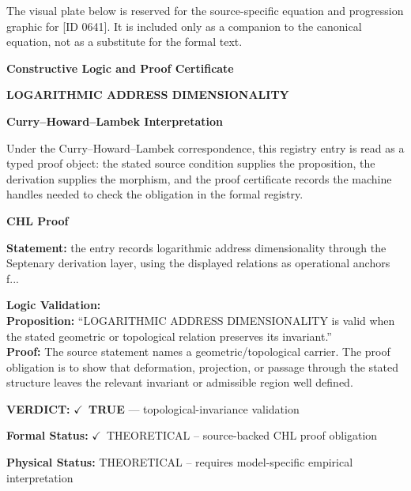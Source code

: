 \begingroup\footnotesize\sloppy
The visual plate below is reserved for the source-specific equation and progression graphic for [ID 0641]. It is included only as a companion to the canonical equation, not as a substitute for the formal text.
\par\endgroup
\ifTZPDarkEdition
{}
\fi

\clearpage
\begingroup\tzpsupportsetup
\noindent\textbf{\fontsize{10.8pt}{12.8pt}\selectfont [ID 0641] Constructive Logic and Proof Certificate}\par
\noindent\textbf{\fontsize{10pt}{12pt}\selectfont LOGARITHMIC ADDRESS DIMENSIONALITY}\par
\vspace{0.45em}
\begingroup
\footnotesize
\setlength{\parskip}{0.22em}
\setlength{\parindent}{0pt}
\noindent\textbf{Curry--Howard--Lambek Interpretation}\par
Under the Curry--Howard--Lambek correspondence, this registry entry is read as a typed proof
object: the stated source condition supplies the proposition, the derivation supplies the
morphism, and the proof certificate records the machine handles needed to check the obligation
in the formal registry.

\vspace{0.45em}
\noindent\textbf{CHL Proof}\par
\textbf{Statement:} the entry records logarithmic address dimensionality through the Septenary derivation
layer, using the displayed relations as operational anchors f...

\textbf{Logic Validation:}\\
\textbf{Proposition:} ``LOGARITHMIC ADDRESS DIMENSIONALITY is valid when the stated geometric or topological
relation preserves its invariant.''\\
\textbf{Proof:} The source statement names a geometric/topological carrier. The proof obligation is to
show that deformation, projection, or passage through the stated structure leaves the
relevant invariant or admissible region well defined.

\textbf{VERDICT:} \ensuremath{\checkmark}\ \textbf{TRUE} --- topological-invariance validation

\textbf{Formal Status:} \ensuremath{\checkmark}\ THEORETICAL -- source-backed CHL proof obligation

\textbf{Physical Status:} THEORETICAL -- requires model-specific empirical interpretation
\par\vspace{0.45em}
\par
\ifTZPDarkEdition
{}
\fi
\endgroup
\endgroup
